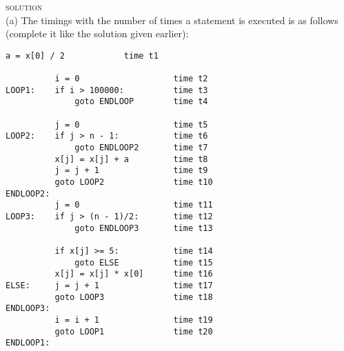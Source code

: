 \newpage
\textsc{solution}\\
(a)
The timings with the number of times a statement is executed
is as follows (complete it like the solution given earlier):
\begin{Verbatim}[frame=single]
          a = x[0] / 2            time t1

          i = 0                   time t2           
LOOP1:    if i > 100000:          time t3
              goto ENDLOOP        time t4

          j = 0                   time t5
LOOP2:    if j > n - 1:           time t6
              goto ENDLOOP2       time t7
          x[j] = x[j] + a         time t8
          j = j + 1               time t9
          goto LOOP2              time t10
ENDLOOP2:
          j = 0                   time t11
LOOP3:    if j > (n - 1)/2:       time t12
              goto ENDLOOP3       time t13

          if x[j] >= 5:           time t14
              goto ELSE           time t15
          x[j] = x[j] * x[0]      time t16
ELSE:     j = j + 1               time t17
          goto LOOP3              time t18
ENDLOOP3:
          i = i + 1               time t19
          goto LOOP1              time t20
ENDLOOP1:
\end{Verbatim}

